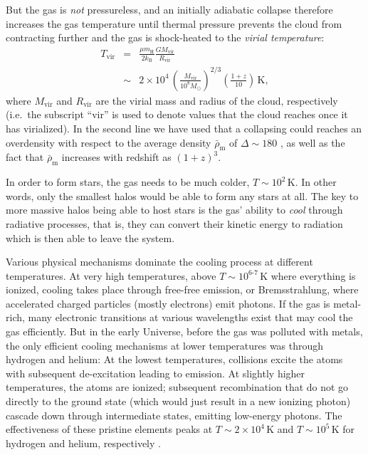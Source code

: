 \documentclass[useAMS,usenatbib,bibyear]{aa}
\begin{document}
But the gas is \emph{not} pressureless, and an initially adiabatic collapse therefore increases the gas temperature until thermal pressure prevents the cloud from contracting further and the gas is shock-heated to the \emph{virial temperature}:
\begin{eqnarray}
    \label{eq:Tvir}
    \nonumber
    T_\mathrm{vir} & = & \frac{\mu m_\mathrm{H}}{2 k_\mathrm{B}} \frac{G M_\mathrm{vir}}{R_\mathrm{vir}}\\
    & \sim & 2\times10^4 \, \left( \frac{M_\mathrm{vir}}{10^8M_\odot} \right)^{2/3}
          \left( \frac{1+z}{10} \right) \, \mathrm{K},
\end{eqnarray}
where $M_\mathrm{vir}$ and $R_\mathrm{vir}$ are the virial mass and radius of the cloud, respectively (i.e.~the subscript ``vir'' is used to denote values that the cloud reaches once it has virialized).
In the second line we have used that a collapsing could reaches an overdensity with respect to the average density $\bar{\rho}_\mathrm{m}$ of $\Delta\sim180$ \citep[e.g.][]{Binney2008}, as well as the fact that $\bar{\rho}_\mathrm{m}$ increases with redshift as $(1+z)^3$.

In order to form stars, the gas needs to be much colder, $T\sim10^2\,\mathrm{K}$.
In other words, only the smallest halos would be able to form any stars at all.
The key to more massive halos being able to host stars is the gas' ability to \emph{cool} through radiative processes, that is, they can convert their kinetic energy to radiation which is then able to leave the system.

Various physical mechanisms dominate the cooling process at different temperatures.
At very high temperatures, above $T\sim10^{6\text{-}7}\,\mathrm{K}$ where everything is ionized, cooling takes place through free-free emission, or Bremsstrahlung, where accelerated charged particles (mostly electrons) emit photons.
If the gas is metal-rich, many electronic transitions at various wavelengths exist that may cool the gas efficiently.
But in the early Universe, before the gas was polluted with metals, the only efficient cooling mechanisms at lower temperatures was through hydrogen and helium:
At the lowest temperatures, collisions excite the atoms with subsequent de-excitation leading to emission.
At slightly higher temperatures, the atoms are ionized; subsequent recombination that do not go directly to the ground state (which would just result in a new ionizing photon) cascade down through intermediate states, emitting low-energy photons.
The effectiveness of these pristine elements peaks at $T\sim2\times10^4\,\mathrm{K}$ and $T\sim10^5\,\mathrm{K}$ for hydrogen and helium, respectively \citep[see e.g.][]{Katz1996}.
\end{document}
